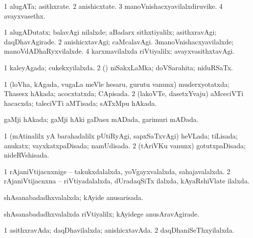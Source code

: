 \bentry
{} 
\gl{\nA}
\expl{}
\bmng
\bnum
\num{1} alugATa; asithxrate. 
\num{2} anishicxtate. 
\num{3} manoVnishacxyavilalxdiruvike. 
\num{4} avayxvasethx. 
\enum
\emng
\eentry

\bentry
{} 
\gl{\kirxvi}
\expl{}
\bmng
\bnum
\num{1} alugADutatx; balavAgi nilalxde; aBadarx sithxtiyalilx; asithxravAgi; daqDhavAgirade. 
\num{2} anishicxtavAgi; caMcalavAgi. 
\num{3}manoVnishacxyavilalxde; manoVdADhaRyxvilalxde. 
\num{4} karxmavilalxda riVtiyalilx; avayxvasithxtavAgi. 
\enum
\emng
\eentry

\bentry
{} 
\gl{\gu}
\expl{}
\bmng
\bnum
\num{1} kaleyAgada; cukekxyilalxda. 
\num{2} (\rUpa) niSakxLaMka; doVSarahita; niduRSaTx. 
\enum
\emng
\eentry

\bentry
{} 
\gl{\gu}
\expl{}
\bmng
\bnum
\num{1} (loVha, kAgada, \mo vugaLa meVle hesaru, gurutu \mo vanunx) muderxyotatxda; Thasesx hAkada; acocxtatxda; CApisada. 
\num{2} (lakoVTe, dasetxYvaju) aMceciVTi hacacxda; taleciVTi aMTisada; sATxMpu hAkada. 
\enum
\emng
\eentry

\bentry
{} 
\gl{\gu}
\expl{}
\bmng
gaMji hAkada; gaMji hAki gaDasu mADada, garimuri mADada. 
\emng
\eentry

\bentry
{} 
\gl{\gu}
\expl{}
\bmng
\bnum
\num{1} (mAtinalilx yA barahadalilx pUtiRyAgi, sapxSaTxvAgi) heVLada; tiLisada; anukatx; vayxkatxpaDisada; namUdisada. 
\num{2} (tAriVKu \mo vanunx) gotutxpaDisada; nideRVshisada. 
\enum
\emng
\eentry

\bentry
{} 
\gl{\gu}
\expl{}
\bmng
\bnum
\num{1} rAjaniVtijacnxnige -- takukxdalalxda, yoVgayxvalalxda, sahajavalalxda. 
\num{2} rAjaniVtijacnxna -- riVtiyadalalxda, dUradaqSiTx ilalxda, kAyaRshiVlate ilalxda. 
\enum
\emng
\eentry

\bentry
{} 
\gl{\gu}
\expl{}
\bmng
shAsanabadadhxvalalxda; kAyide anusarisada. 
\emng
\eentry

\bentry
{} 
\gl{\kirxvi}
\expl{}
\bmng
shAsanabadadhxvalalxda riVtiyalilx; kAyidege anusAravAgirade. 
\emng
\eentry

\bentry
{} 
\gl{\gu}
\expl{}
\bmng
\bnum
\num{1} asithxravAda; daqDhavilalxda; anishicxtavAda. 
\num{2} daqDhaniSeThxyilalxda. 
\enum
\emng
\eentry

